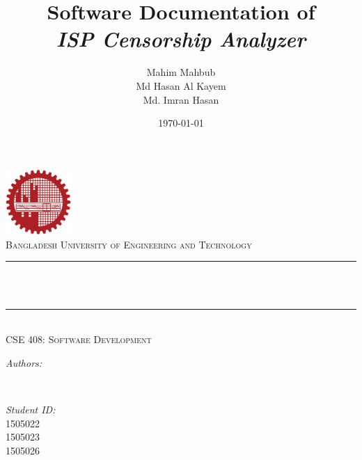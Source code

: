 \documentclass[12pt]{article}
\title{Software Documentation of \vspace{0.5cm}\\
\emph{ISP Censorship Analyzer}	}
\author{Mahim Mahbub\\
Md Hasan Al Kayem\\
Md. Imran Hasan}
\date{\today}
\makeatletter
\let\thetitle\@title
\let\theauthor\@author
\let\thedate\@date
\makeatother
\begin{document}

\begin{titlepage}
	\centering
    \vspace*{0.5 cm}
    \includegraphics[height=2.5cm]{buet_logo.png}\\[1.0 cm]	%
    \textsc{\large Bangladesh University of Engineering and Technology}\\[2.0 cm]	%
	\rule{\linewidth}{0.2 mm} \\[0.4 cm]
	{ \huge \bfseries \thetitle}\\
	\rule{\linewidth}{0.2 mm} \\[1.5 cm]
	\textsc{\large CSE 408: Software Development}\\[0.5 cm]				%
    \vspace{1cm}
	\begin{minipage}{0.4\textwidth}
		\begin{flushleft} \large
			\emph{Authors:}\\
			\theauthor
			\end{flushleft}
			\end{minipage}~
			\begin{minipage}{0.4\textwidth}
			\begin{flushright} \large
			\emph{Student ID:} \\
			1505022\\
			1505023\\
			1505026
		\end{flushright}
	\end{minipage}\\[2 cm]
	
	{\large \thedate}\\[2 cm]
 
	\vfill
	
\end{titlepage}


\newpage
\end{document}
